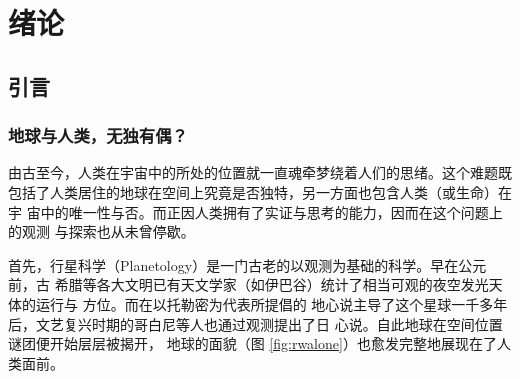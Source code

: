 \chapter{绪论} \label{chapter:intro}


\section{引言}
\subsection{地球与人类，无独有偶？}

由古至今，人类在宇宙中的所处的位置就一直魂牵梦绕着人们的思绪。这个难题既
包括了人类居住的地球在空间上究竟是否独特，另一方面也包含人类（或生命）在宇
宙中的唯一性与否。而正因人类拥有了实证与思考的能力，因而在这个问题上的观测
与探索也从未曾停歇。

首先，行星科学（Planetology）是一门古老的以观测为基础的科学。早在公元前，古
希腊等各大文明已有天文学家（如伊巴谷）统计了相当可观的夜空发光天体的运行与
方位\cite{Xuan1992, wikipedia_astronomer}。而在以托勒密为代表所提倡的
地心说主导了这个星球一千多年后，文艺复兴时期的哥白尼等人也通过观测提出了日
心说\cite{Copernicus1543}。自此地球在空间位置谜团便开始层层被揭开，
地球的面貌（图 \ref{fig:rwalone}）也愈发完整地展现在了人类面前。

